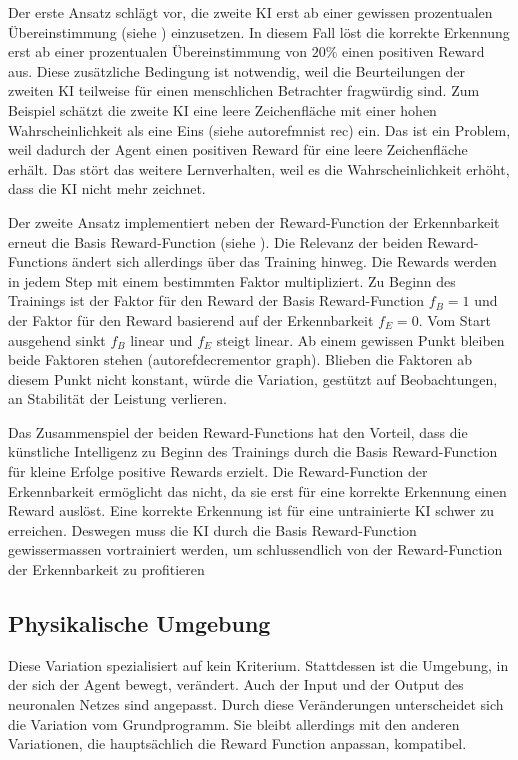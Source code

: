 Der erste Ansatz schlägt vor, die zweite KI erst ab einer gewissen prozentualen
Übereinstimmung (siehe ) einzusetzen. In diesem Fall
löst die korrekte Erkennung erst ab einer prozentualen Übereinstimmung von
$20\%$ einen positiven Reward aus. Diese zusätzliche Bedingung ist notwendig,
weil die Beurteilungen der zweiten KI teilweise für einen menschlichen
Betrachter fragwürdig sind. Zum Beispiel schätzt die zweite KI eine leere
Zeichenfläche mit einer hohen Wahrscheinlichkeit als eine Eins (siehe
autoref{mnist rec}) ein. Das ist ein Problem, weil dadurch der Agent einen
positiven Reward für eine leere Zeichenfläche erhält. Das stört das weitere
Lernverhalten, weil es die Wahrscheinlichkeit erhöht, dass die KI nicht mehr
zeichnet.


Der zweite Ansatz implementiert neben der Reward-Function der Erkennbarkeit
erneut die Basis Reward-Function (siehe ). Die Relevanz
der beiden Reward-Functions ändert sich allerdings über das Training hinweg. Die
Rewards werden in jedem Step mit einem bestimmten Faktor multipliziert. Zu
Beginn des Trainings ist der Faktor für den Reward der Basis Reward-Function
$f_B = 1$ und der Faktor für den Reward basierend auf der Erkennbarkeit $f_E =
0$. Vom Start ausgehend sinkt $f_B$ linear und $f_E$ steigt linear. Ab einem
gewissen Punkt bleiben beide Faktoren stehen (autoref{decrementor graph}).
Blieben die Faktoren ab diesem Punkt nicht konstant, würde die Variation,
gestützt auf Beobachtungen, an Stabilität der Leistung verlieren.


Das Zusammenspiel der beiden Reward-Functions hat den Vorteil, dass die
künstliche Intelligenz zu Beginn des Trainings durch die Basis Reward-Function
für kleine Erfolge positive Rewards erzielt. Die Reward-Function der
Erkennbarkeit ermöglicht das nicht, da sie erst für eine korrekte Erkennung
einen Reward auslöst. Eine korrekte Erkennung ist für eine untrainierte KI
schwer zu erreichen. Deswegen muss die KI durch die Basis Reward-Function
gewissermassen vortrainiert werden, um schlussendlich von der Reward-Function
der Erkennbarkeit zu profitieren


\subsection{Physikalische Umgebung}
\label{sub:m_var_phy}

Diese Variation spezialisiert auf kein Kriterium. Stattdessen ist die Umgebung,
in der sich der Agent bewegt, verändert. Auch der Input und der Output des
neuronalen Netzes sind angepasst. Durch diese Veränderungen unterscheidet sich die
Variation vom Grundprogramm. Sie bleibt allerdings mit den anderen
Variationen, die hauptsächlich die Reward Function anpassan, kompatibel.

